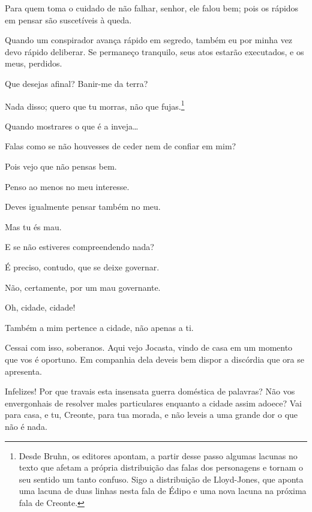    Para quem toma o cuidado de não falhar, senhor, ele falou bem; pois os
rápidos em pensar são suscetíveis à queda.

   Quando um conspirador avança rápido em segredo, também eu por minha vez
 devo rápido deliberar. Se permaneço tranquilo, seus atos estarão
executados, e os meus, perdidos.

   Que desejas afinal? Banir-me da terra?

   Nada disso; quero que tu morras, não que fujas.\footnote{Desde Bruhn, os editores apontam, a partir desse
  passo algumas lacunas no texto que afetam a própria distribuição das
  falas dos personagens e tornam o seu sentido um tanto confuso. Sigo a
  distribuição de Lloyd-Jones, que aponta uma lacuna de duas linhas
  nesta fala de Édipo e uma nova lacuna na próxima fala de Creonte.}

   Quando mostrares o que é a inveja\ldots{}

   Falas como se não houvesses de ceder nem de confiar em mim?

   Pois vejo que não pensas bem.

   Penso ao menos no meu interesse.

   Deves igualmente pensar também no meu.

   Mas tu és mau.

   E se não estiveres compreendendo nada?

   É preciso, contudo, que se deixe governar.

   Não, certamente, por um mau governante.

   Oh, cidade, cidade!

   Também a mim pertence a cidade, não apenas a ti.

   Cessai com isso, soberanos. Aqui vejo Jocasta, vindo de casa em um
momento que vos é oportuno. Em companhia dela deveis bem dispor a
discórdia que ora se apresenta.


   Infelizes! Por que travais esta insensata guerra doméstica de palavras?
Não vos envergonhais de resolver males particulares enquanto a cidade
assim adoece? Vai para casa, e tu, Creonte, para tua morada, e não
leveis a uma grande dor o que não é nada.

